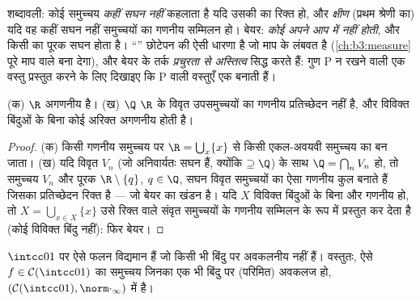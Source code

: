 \begin{remark}\label{rem:b3:complete:meagre}
शब्दावली: कोई समुच्चय \emph{कहीं सघन नहीं} कहलाता है यदि उसकी
 का  रिक्त हो, और \emph{क्षीण}
(प्रथम श्रेणी का) यदि वह कहीं सघन नहीं समुच्चयों का गणनीय
सम्मिलन हो। बेयर: \emph{कोई  अपने आप में 
नहीं होती}, और किसी  का पूरक सघन होता है। ``''
छोटेपन की ऐसी धारणा है जो माप के लंबवत है (\cref{ch:b3:measure} पूरे माप वाले
 बना देगा), और बेयर के तर्क \emph{प्रचुरता से
अस्तित्व} सिद्ध करते हैं: गुण P न रखने वाली एक वस्तु प्रस्तुत
करने के लिए दिखाइए कि P वाली वस्तुएँ एक  बनाती हैं।
\end{remark}

\begin{corollary}\label{cor:b3:complete:bairecors}
(क) $\R$ अगणनीय है। (ख) $\Q$ $\R$ के विवृत उपसमुच्चयों का
गणनीय प्रतिच्छेदन नहीं है, और विविक्त बिंदुओं के बिना कोई अरिक्त
 अगणनीय होती है।
\end{corollary}

\begin{proof}
(क) किसी गणनीय समुच्चय पर $\R = \bigcup_{x}\{x\}$ से किसी एकल-अवयवी समुच्चय का
 बन जाता। (ख) यदि विवृत $V_n$ (जो अनिवार्यतः सघन हैं,
क्योंकि $\supseteq \Q$) के साथ $\Q = \bigcap_n V_n$ हो, तो समुच्चय $V_n$ और पूरक $\R\setminus\{q\}$,
$q \in \Q$, सघन विवृत समुच्चयों का ऐसा गणनीय कुल बनाते हैं जिसका
प्रतिच्छेदन रिक्त है --- जो बेयर का खंडन है। यदि $X$ विविक्त
बिंदुओं के बिना  और गणनीय हो, तो $X = \bigcup_{x \in X}\{x\}$ उसे रिक्त 
वाले संवृत समुच्चयों के गणनीय सम्मिलन के रूप में प्रस्तुत कर देता
है (कोई विविक्त बिंदु नहीं): फिर बेयर।
\end{proof}

\begin{theorem}[वाइरश्ट्रास के राक्षस विद्यमान हैं]
\label{thm:b3:complete:nowherediff}
$\intcc01$ पर ऐसे  फलन विद्यमान हैं जो किसी भी बिंदु पर अवकलनीय
नहीं हैं। वस्तुतः, ऐसे $f \in \mathcal C(\intcc01)$ का समुच्चय जिनका एक भी बिंदु पर
(परिमित) अवकलज हो, $(\mathcal C(\intcc01), \norm\cdot_\infty)$ में  है।
\end{theorem}

